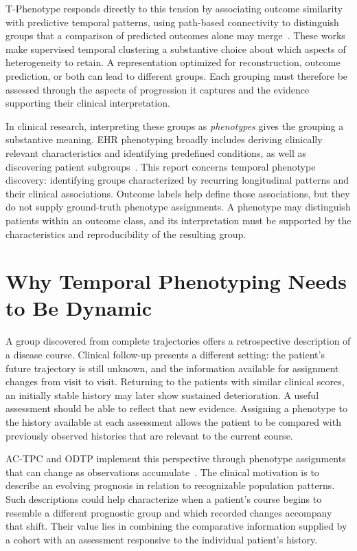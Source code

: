 T-Phenotype responds directly to this tension by associating outcome similarity with predictive temporal patterns, using path-based connectivity to distinguish groups that a comparison of predicted outcomes alone may merge~\cite{qin2023tphenotype}. These works make supervised temporal clustering a substantive choice about which aspects of heterogeneity to retain. A representation optimized for reconstruction, outcome prediction, or both can lead to different groups. Each grouping must therefore be assessed through the aspects of progression it captures and the evidence supporting their clinical interpretation.

In clinical research, interpreting these groups as \emph{phenotypes} gives the grouping a substantive meaning. EHR phenotyping broadly includes deriving clinically relevant characteristics and identifying predefined conditions, as well as discovering patient subgroups~\cite{hripcsak2013phenotyping}. This report concerns temporal phenotype discovery: identifying groups characterized by recurring longitudinal patterns and their clinical associations. Outcome labels help define those associations, but they do not supply ground-truth phenotype assignments. A phenotype may distinguish patients within an outcome class, and its interpretation must be supported by the characteristics and reproducibility of the resulting group.

\section{Why Temporal Phenotyping Needs to Be Dynamic}

A group discovered from complete trajectories offers a retrospective description of a disease course. Clinical follow-up presents a different setting: the patient's future trajectory is still unknown, and the information available for assignment changes from visit to visit. Returning to the patients with similar clinical scores, an initially stable history may later show sustained deterioration. A useful assessment should be able to reflect that new evidence. Assigning a phenotype to the history available at each assessment allows the patient to be compared with previously observed histories that are relevant to the current course.

AC-TPC and ODTP implement this perspective through phenotype assignments that can change as observations accumulate~\cite{lee2020actpc,lee2021odtp}. The clinical motivation is to describe an evolving prognosis in relation to recognizable population patterns. Such descriptions could help characterize when a patient's course begins to resemble a different prognostic group and which recorded changes accompany that shift. Their value lies in combining the comparative information supplied by a cohort with an assessment responsive to the individual patient's history.


